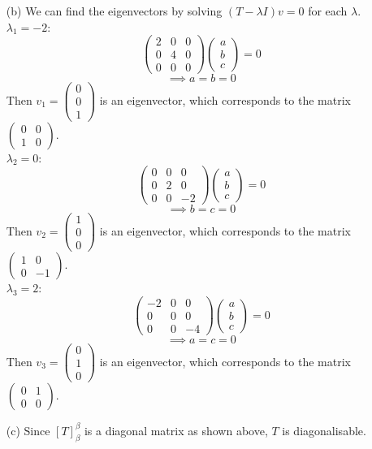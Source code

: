 \documentclass{article}
\begin{document}
\begin{itemize}
\begin{itemize}
              \item [(b)] We can find the eigenvectors by solving $(T-\lambda I)v=0$ for each $\lambda$.\\$\lambda_1=-2$:\[\begin{pmatrix}2&0&0\\0&4&0\\0&0&0\end{pmatrix}\begin{pmatrix}a\\b\\c\end{pmatrix}=0\]\[\implies a=b=0\]Then $v_1=\begin{pmatrix}0\\0\\1\end{pmatrix}$ is an eigenvector, which corresponds to the matrix $\begin{pmatrix}0&0\\1&0\end{pmatrix}$.\\$\lambda_2=0$:\[\begin{pmatrix}0&0&0\\0&2&0\\0&0&-2\end{pmatrix}\begin{pmatrix}a\\b\\c\end{pmatrix}=0\]\[\implies b=c=0\]Then $v_2=\begin{pmatrix}1\\0\\0\end{pmatrix}$ is an eigenvector, which corresponds to the matrix $\begin{pmatrix}1&0\\0&-1\end{pmatrix}$.\\$\lambda_3=2$:\[\begin{pmatrix}-2&0&0\\0&0&0\\0&0&-4\end{pmatrix}\begin{pmatrix}a\\b\\c\end{pmatrix}=0\]\[\implies a=c=0\]Then $v_3=\begin{pmatrix}0\\1\\0\end{pmatrix}$ is an eigenvector, which corresponds to the matrix $\begin{pmatrix}0&1\\0&0\end{pmatrix}$.
              \item [(c)] Since $[T]_\beta^\beta$ is a diagonal matrix as shown above, $T$ is diagonalisable.
          \end{itemize}
\end{itemize}
\end{document}
